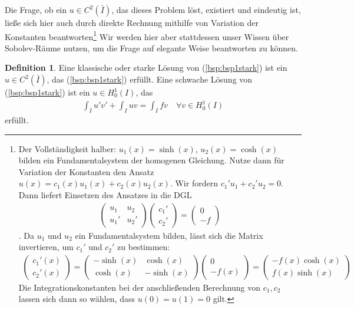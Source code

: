 \documentclass[twoside]{article}
\theoremstyle{definition}
\newtheorem{definition}[theorem]{Definition}
\begin{document}
Die Frage, ob ein $u \in C^2(\bar{I})$, das dieses Problem löst, existiert und eindeutig ist, ließe sich hier auch durch direkte Rechnung mithilfe von Variation der Konstanten beantworten\footnote{Der Vollständigkeit halber: $u_1(x)= \sinh(x)$, $u_2(x) = \cosh(x)$ bilden ein Fundamentalsystem der homogenen Gleichung. Nutze dann für Variation der Konstanten den Ansatz $u(x) = c_1(x) u_1(x) + c_2(x) u_2(x)$. Wir fordern $c_1'u_1+c_2'u_2 = 0$. Dann liefert Einsetzen des Ansatzes in die DGL
\begin{align*}
\left(\begin{array}{cc}
u_1 & u_2\\
u_1' & u_2'
\end{array} \right) \left(\begin{array}{c}
c_1'\\
c_2'
\end{array} \right) =\left(\begin{array}{c}
0\\
-f
\end{array} \right) 
\end{align*}. Da $u_1$ und $u_2$ ein Fundamentalsystem bilden, lässt sich die Matrix invertieren, um $c_1'$ und $c_2'$ zu bestimmen:
\begin{align*}
 \left(\begin{array}{c}
c_1'(x)\\
c_2'(x)
\end{array} \right) = \left(\begin{array}{cc}
- \sinh(x) & \cosh(x)\\
\cosh(x) & -\sinh(x)
\end{array} \right)\left(\begin{array}{c}
0\\
-f(x)
\end{array} \right)  = \left(\begin{array}{c}
-f(x) \cosh(x)\\
f(x) \sinh(x)
\end{array} \right) 
\end{align*} Die Integrationskonstanten bei der anschließenden Berechnung von $c_1, c_2$ lassen sich dann so wählen, dass $u(0)=u(1)=0$ gilt.} Wir werden hier aber stattdessen unser Wissen über Sobolev-Räume nutzen, um die Frage auf elegante Weise beantworten zu können.
\begin{definition}
Eine klassische oder starke Lösung von (\ref{bsp:bsp1stark}) ist ein $u \in C^2(\bar{I})$, das (\ref{bsp:bsp1stark}) erfüllt. Eine schwache Lösung von (\ref{bsp:bsp1stark}) ist ein $u \in H_0^1(I)$, das 
\begin{align}
\int_I u'v' + \int_I uv = \int_I fv \quad \forall v \in H_0^1(I)  \label{bsp:bsp1schwach}
\end{align} 
erfüllt.
\end{definition}
\end{document}
